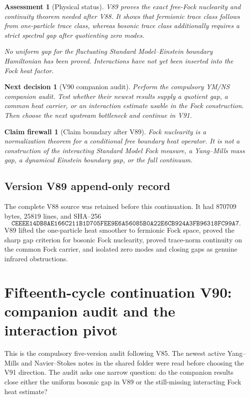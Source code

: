 \documentclass[11pt]{article}
\newtheorem{firewall}[theorem]{Claim firewall}
\newtheorem{decision}[theorem]{Next decision}
\newtheorem{assessment}[theorem]{Assessment}
\theoremstyle{remark}
\begin{document}
\begin{assessment}[Physical status]
\label{ass:v15v89-status}
V89 proves the exact free-Fock nuclearity and continuity theorem
needed after V88.  It shows that fermionic trace class follows from
one-particle trace class, whereas bosonic trace class additionally
requires a strict spectral gap after quotienting zero modes.

No uniform gap for the fluctuating Standard Model--Einstein
boundary Hamiltonian has been proved.  Interactions have not yet
been inserted into the Fock heat factor.
\end{assessment}

\begin{decision}[V90 companion audit]
\label{dec:v15v89-next}
Perform the compulsory YM/NS companion audit.  Test whether their
newest results supply a quotient gap, a common heat carrier, or an
interaction estimate usable in the Fock construction.  Then choose
the next upstream bottleneck and continue in V91.
\end{decision}

\begin{firewall}[Claim boundary after V89]
\label{fire:v15v89}
Fock nuclearity is a normalization theorem for a conditional free
boundary heat operator.  It is not a construction of the interacting
Standard Model Fock measure, a Yang--Mills mass gap, a dynamical
Einstein boundary gap, or the full continuum.
\end{firewall}

\section*{Version V89 append-only record}
The complete V88 source was retained before this continuation.  It
had \(870709\) bytes, \(25819\) lines, and SHA--256
\[
 \texttt{CEEEE14DB8AE166C211B1D705FEE9E6A56085B0A22E6CB924A3FB96318FC99A7}.
\]
V89 lifted the one-particle heat smoother to fermionic Fock space,
proved the sharp gap criterion for bosonic Fock nuclearity, proved
trace-norm continuity on the common Fock carrier, and isolated zero
modes and closing gaps as genuine infrared obstructions.
\chapter{Fifteenth-cycle continuation V90: companion audit and the interaction pivot}
\label{sec:v15v90}

This is the compulsory five-version audit following V85.  The
newest active Yang--Mills and Navier--Stokes notes in the shared
folder were read before choosing the V91 direction.  The audit asks
one narrow question: do the companion results close either the
uniform bosonic gap in V89 or the still-missing interacting Fock
heat estimate?
\end{document}
